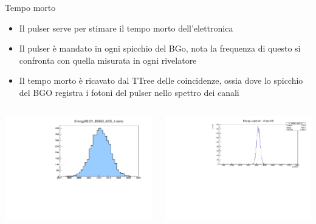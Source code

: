 \documentclass [xcolor=svgnames] {beamer}
\begin{document}
\begin{frame}{Tempo morto}%
	\begin{itemize}
		\item Il pulser serve per stimare il tempo morto dell'elettronica
		\item Il pulser è mandato in ogni spicchio del BGo, nota la frequenza di questo si confronta con quella misurata in ogni rivelatore
		\item Il tempo morto è ricavato dal TTree delle coincidenze, ossia dove lo spicchio del BGO registra i fotoni del pulser nello spettro dei canali%
	\end{itemize}
	\begin{columns}
		\begin{column}{0.5\textwidth}
			\includegraphics[width=\textwidth]{img/run1776_coinc_h_EBGO_ADC_4_COINC.pdf}
		\end{column}
		\begin{column}{0.5\textwidth}
			\includegraphics[width=\textwidth]{img/pulser.pdf}
		\end{column}
	\end{columns}
\end{frame}
\end{document}
